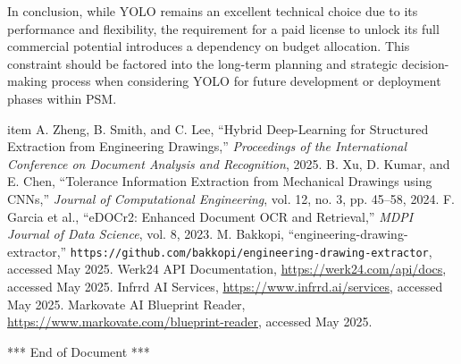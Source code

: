 \documentclass[11pt,a4paper]{article}
\begin{document}
In conclusion, while YOLO remains an excellent technical choice due to its performance and flexibility, the requirement for a paid license to unlock its full commercial potential introduces a dependency on budget allocation. This constraint should be factored into the long-term planning and strategic decision-making process when considering YOLO for future development or deployment phases within PSM.


\begin{thebibliography}{9}
  \bibitem{}item A. Zheng, B. Smith, and C. Lee, “Hybrid Deep-Learning for Structured Extraction from Engineering Drawings,” \textit{Proceedings of the International Conference on Document Analysis and Recognition}, 2025.
  \bibitem B. Xu, D. Kumar, and E. Chen, “Tolerance Information Extraction from Mechanical Drawings using CNNs,” \textit{Journal of Computational Engineering}, vol. 12, no. 3, pp. 45–58, 2024.
  \bibitem F. Garcia et al., “eDOCr2: Enhanced Document OCR and Retrieval,” \textit{MDPI Journal of Data Science}, vol. 8, 2023.
  \bibitem M. Bakkopi, “engineering-drawing-extractor,” \texttt{https://github.com/bakkopi/engineering-drawing-extractor}, accessed May 2025.
  \bibitem Werk24 API Documentation, \url{https://werk24.com/api/docs}, accessed May 2025.
  \bibitem Infrrd AI Services, \url{https://www.infrrd.ai/services}, accessed May 2025.
  \bibitem Markovate AI Blueprint Reader, \url{https://www.markovate.com/blueprint-reader}, accessed May 2025.
\end{thebibliography}

\vfill
\begin{center}
*** End of Document ***
\end{center}
\end{document}
